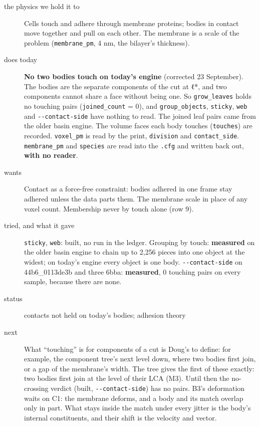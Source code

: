 \begin{description}
\item[{the physics we hold it to}] Cells touch and adhere through membrane proteins; bodies in contact move together and pull on each other. The membrane is a scale of the problem (\texttt{membrane\_\allowbreak{}pm}, 4 nm, the bilayer's thickness).
\item[{does today}] \textbf{No two bodies touch on today's engine} (corrected 23 September). The bodies are the separate components of the cut at ℓ*, and two components cannot share a face without being one. So \texttt{grow\_\allowbreak{}leaves} holds no touching pairs (\texttt{joined\_\allowbreak{}count} = 0), and \texttt{group\_\allowbreak{}objects}, \texttt{sticky}, \texttt{web} and \texttt{-\allowbreak{}-\allowbreak{}contact-\allowbreak{}side} have nothing to read. The joined leaf pairs came from the older basin engine. The volume faces each body touches (\texttt{touches}) are recorded. \texttt{voxel\_\allowbreak{}pm} is read by the print, \texttt{division} and \texttt{contact\_\allowbreak{}side}. \texttt{membrane\_\allowbreak{}pm} and \texttt{species} are read into the \texttt{.\allowbreak{}cfg} and written back out, \textbf{with no reader}.
\item[{wants}] Contact as a force-free constraint: bodies adhered in one frame stay adhered unless the data parts them. The membrane scale in place of any voxel count. Membership never by touch alone (row 9).
\item[{tried, and what it gave}] \texttt{sticky}, \texttt{web}: built, no run in the ledger. Grouping by touch: \textbf{measured} on the older basin engine to chain up to 2,256 pieces into one object at the widest; on today's engine every object is one body. \texttt{-\allowbreak{}-\allowbreak{}contact-\allowbreak{}side} on 44b6\_\allowbreak{}0113de3b and three 6bba: \textbf{measured}, 0 touching pairs on every sample, because there are none.
\item[{status}] contacts not held on today's bodies; adhesion theory
\item[{next}] What “touching” is for components of a cut is Doug's to define: for example, the component tree's next level down, where two bodies first join, or a gap of the membrane's width. The tree gives the first of these exactly: two bodies first join at the level of their LCA (M3). Until then the no-crossing verdict (built, \texttt{-\allowbreak{}-\allowbreak{}contact-\allowbreak{}side}) has no pairs. B3's deformation waits on C1: the membrane deforms, and a body and its match overlap only in part. What stays inside the match under every jitter is the body's internal constituents, and their shift is the velocity and vector.
\end{description}

